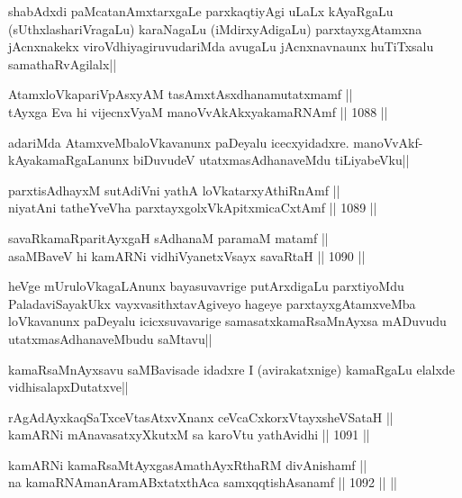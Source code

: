\begin{artha}
shabAdxdi paMcatanAmxtarxgaLe parxkaqtiyAgi uLaLx kAyaRgaLu (sUthxlashariVragaLu) karaNagaLu (iMdirxyAdigaLu) parxtayxgAtamxna jAcnxnakekx viroVdhiyagiruvudariMda avugaLu jAcnxnavnaunx huTiTxsalu samathaRvAgilalx||
\end{artha}

\begin{shl}
AtamxloVkapariVpAsxyAM tasAmxtAsxdhanamutatxmamf || \\
tAyxga Eva hi vijecnxVyaM manoVvAkAkxyakamaRNAmf ||  1088 ||  
\end{shl}

\begin{artha}
adariMda AtamxveMbaloVkavanunx paDeyalu icecxyidadxre. manoVvAkf-kAyakamaRgaLanunx biDuvudeV utatxmasAdhanaveMdu tiLiyabeVku||
\end{artha}

\begin{shl}
parxtisAdhayxM sutAdiVni yathA loVkatarxyAthiRnAmf || \\
niyatAni tatheYveVha parxtayxgolxVkApitxmicaCxtAmf ||  1089 ||  
\end{shl}
				
\begin{shl}
savaRkamaRparitAyxgaH sAdhanaM paramaM matamf || \\
asaMBaveV hi kamARNi vidhiVyanetxV\s sayx savaRtaH ||  1090 ||  
\end{shl}

\begin{artha}
heVge mUruloVkagaLAnunx bayasuvavrige putArxdigaLu parxtiyoMdu PaladaviSayakUkx vayxvasithxtavAgiveyo hageye parxtayxgAtamxveMba loVkavanunx paDeyalu icicxsuvavarige samasatxkamaRsaMnAyxsa mADuvudu utatxmasAdhanaveMbudu saMtavu||
\end{artha}

\begin{artha}
kamaRsaMnAyxsavu saMBavisade idadxre I (avirakatxnige) kamaRgaLu elalxde vidhisalapxDutatxve||
\end{artha}

\begin{shl}
rAgAdAyxkaqSaTxceVtasAtxvXnanx ceVcaCxkorxVtayxsheVSataH || \\
kamARNi mAnavasatxyXkutxM sa karoVtu yathAvidhi ||  1091 ||  
\end{shl}
				
\begin{shl}
kamARNi kamaRsaMtAyxgasAmathAyxRthaRM divAnishamf ||  \\
na kamaRNAmanAramABxtatxthAca samxqqtishAsanamf ||  1092 ||  ||  
\end{shl}

